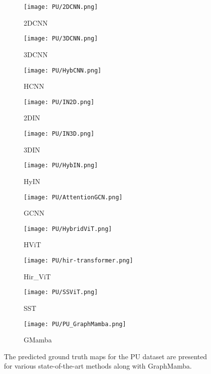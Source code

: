 \documentclass[journal]{IEEEtran}
\begin{document}
\begin{figure*}[!htb]
    \centering
        \begin{subfigure}{0.085\textwidth}
            \texttt{[image: PU/2DCNN.png]}
            \caption{2DCNN}
        \end{subfigure}
        \begin{subfigure}{0.085\textwidth}
            \centering
            \texttt{[image: PU/3DCNN.png]}
            \caption{3DCNN}
        \end{subfigure}
        \begin{subfigure}{0.085\textwidth}
            \centering
            \texttt{[image: PU/HybCNN.png]}
            \caption{HCNN}
        \end{subfigure}
        \begin{subfigure}{0.085\textwidth}
            \centering
            \texttt{[image: PU/IN2D.png]}
            \caption{2DIN}
        \end{subfigure}
        \begin{subfigure}{0.085\textwidth}
            \centering
            \texttt{[image: PU/IN3D.png]}
            \caption{3DIN}
        \end{subfigure}
        \begin{subfigure}{0.085\textwidth}
            \centering
            \texttt{[image: PU/HybIN.png]}
            \caption{HyIN}
        \end{subfigure}
        \begin{subfigure}{0.085\textwidth}
            \centering
            \texttt{[image: PU/AttentionGCN.png]}
            \caption{GCNN}
        \end{subfigure}
        \begin{subfigure}{0.085\textwidth}
            \centering
            \texttt{[image: PU/HybridViT.png]}
            \caption{HViT}
        \end{subfigure}
        \begin{subfigure}{0.085\textwidth}
            \centering
            \texttt{[image: PU/hir-transformer.png]}
            \caption{Hir\_ViT}
        \end{subfigure}
        \begin{subfigure}{0.085\textwidth}
            \centering
            \texttt{[image: PU/SSViT.png]}
            \caption{SST}
        \end{subfigure}
        \begin{subfigure}{0.085\textwidth}
            \centering
            \texttt{[image: PU/PU\_GraphMamba.png]}
            \caption{GMamba}
        \end{subfigure}
    \caption{The predicted ground truth maps for the PU dataset are presented for various state-of-the-art methods along with GraphMamba.}
    \label{fig:PU_results}
\end{figure*}
\end{document}
